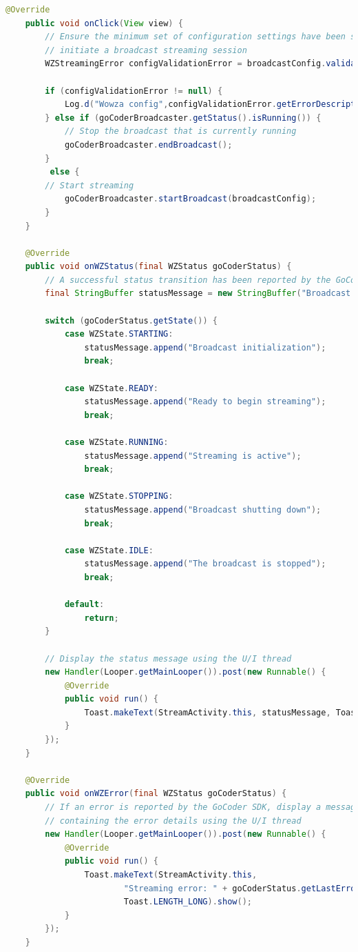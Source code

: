 \documentclass{article}
\begin{document}
\begin{landscape}
\begin{lstlisting}[language=Java,basicstyle=\tiny]
    @Override
    public void onClick(View view) {
        // Ensure the minimum set of configuration settings have been specified necessary to
        // initiate a broadcast streaming session
        WZStreamingError configValidationError = broadcastConfig.validateForBroadcast();

        if (configValidationError != null) {
            Log.d("Wowza config",configValidationError.getErrorDescription());
        } else if (goCoderBroadcaster.getStatus().isRunning()) {
            // Stop the broadcast that is currently running
            goCoderBroadcaster.endBroadcast();
        }
         else {
        // Start streaming
            goCoderBroadcaster.startBroadcast(broadcastConfig);
        }
    }

    @Override
    public void onWZStatus(final WZStatus goCoderStatus) {
        // A successful status transition has been reported by the GoCoder SDK
        final StringBuffer statusMessage = new StringBuffer("Broadcast status: ");

        switch (goCoderStatus.getState()) {
            case WZState.STARTING:
                statusMessage.append("Broadcast initialization");
                break;

            case WZState.READY:
                statusMessage.append("Ready to begin streaming");
                break;

            case WZState.RUNNING:
                statusMessage.append("Streaming is active");
                break;

            case WZState.STOPPING:
                statusMessage.append("Broadcast shutting down");
                break;

            case WZState.IDLE:
                statusMessage.append("The broadcast is stopped");
                break;

            default:
                return;
        }

        // Display the status message using the U/I thread
        new Handler(Looper.getMainLooper()).post(new Runnable() {
            @Override
            public void run() {
                Toast.makeText(StreamActivity.this, statusMessage, Toast.LENGTH_LONG).show();
            }
        });
    }

    @Override
    public void onWZError(final WZStatus goCoderStatus) {
        // If an error is reported by the GoCoder SDK, display a message
        // containing the error details using the U/I thread
        new Handler(Looper.getMainLooper()).post(new Runnable() {
            @Override
            public void run() {
                Toast.makeText(StreamActivity.this,
                        "Streaming error: " + goCoderStatus.getLastError().getErrorDescription(),
                        Toast.LENGTH_LONG).show();
            }
        });
    }


\end{lstlisting}
\end{landscape}
\end{document}
